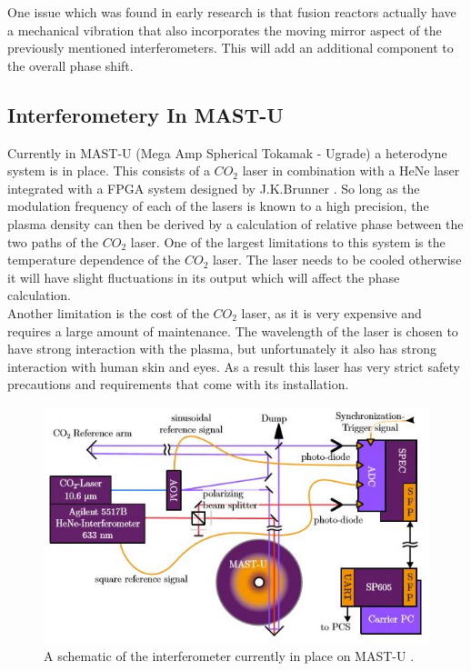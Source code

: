 \documentclass[12pt,a4paper,oneside]{report}
\begin{document}
One issue which was found in early research is that fusion reactors actually have a mechanical vibration that also incorporates the moving mirror aspect of the previously mentioned interferometers. This will add an additional component to the overall phase shift.

    \subsection{Interferometery In MAST-U}
Currently in MAST-U (Mega Amp Spherical Tokamak - Ugrade) a heterodyne system is in place. This consists of a $CO_{2}$ laser in combination with a HeNe laser integrated with a FPGA system designed by J.K.Brunner \cite{Brunner2017}. So long as the modulation frequency of each of the lasers is known to a high precision, the plasma density can then be derived by a calculation of relative phase between the two paths of the $CO_{2}$ laser. One of the largest limitations to this system is the temperature dependence of the $CO_{2}$ laser. The laser needs to be cooled otherwise it will have slight fluctuations in its output which will affect the phase calculation.\\
Another limitation is the cost of the $CO_{2}$ laser, as it is very expensive and requires a large amount of maintenance. The wavelength of the laser is chosen to have strong interaction with the plasma, but unfortunately it also has strong interaction with human skin and eyes. As a result this laser has very strict safety precautions and requirements that come with its installation.    

\begin{figure}[H]
\includegraphics[width=\textwidth, center,angle=0]{Images/mastuint.JPG}
\caption{A schematic of the interferometer currently in place on MAST-U \cite{Brunner2017}.}
\label{MAST-UInt}
\end{figure}
\end{document}
